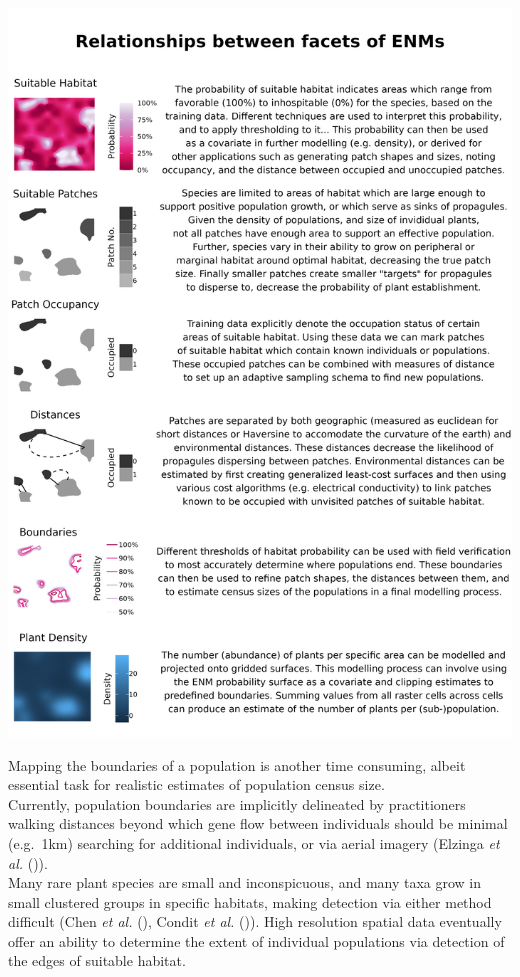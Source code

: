 \documentclass[
]{article}
\begin{document}
\includegraphics[width=37.5in]{../results/ConceptualFigure}

Mapping the boundaries of a population is another time consuming, albeit
essential task for realistic estimates of population census size.\\
Currently, population boundaries are implicitly delineated by
practitioners walking distances beyond which gene flow between
individuals should be minimal (e.g.~1km) searching for additional
individuals, or via aerial imagery (Elzinga \emph{et al.}
()).\\
Many rare plant species are small and inconspicuous, and many taxa grow
in small clustered groups in specific habitats, making detection via
either method difficult (Chen \emph{et al.}
(), Condit \emph{et al.}
()). High resolution spatial data
eventually offer an ability to determine the extent of individual
populations via detection of the edges of suitable habitat.
\end{document}
